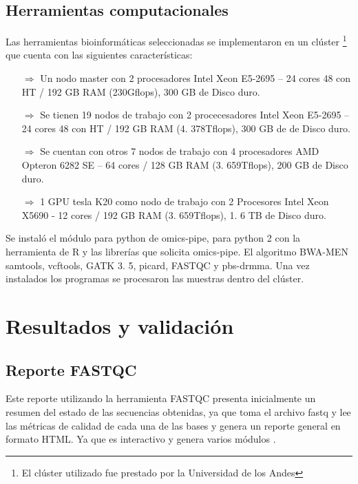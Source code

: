 {\subsection*{Herramientas computacionales}
	
	Las herramientas bioinformáticas seleccionadas se implementaron en un clúster \footnote{El clúster utilizado fue prestado por la Universidad de los Andes} que cuenta con las siguientes características:
	
	\begin{itemize}
		\item[$\Rightarrow$] Un nodo master con 2 procesadores Intel Xeon E5-2695 – 24 cores 48 con HT / 192 GB RAM (230Gflops), 300 GB de Disco duro. 
		\item[$\Rightarrow$] Se tienen 19 nodos de trabajo con 2 procecesadores  Intel Xeon E5-2695 – 24 cores 48 con HT / 192 GB RAM (4. 378Tflops), 300 GB de de Disco duro. 
		\item[$\Rightarrow$] Se cuentan con otros 7 nodos de trabajo con 4 procesadores AMD Opteron 6282 SE – 64 cores / 128 GB RAM (3. 659Tflops), 200 GB de Disco duro. 
		
		\item[$\Rightarrow$] 1 GPU tesla K20 como nodo de trabajo con 2 Procesores  Intel Xeon X5690 - 12 cores / 192 GB RAM (3. 659Tflops), 1. 6 TB de Disco duro. 
		
	\end{itemize}
	
Se instaló el módulo para python de omics-pipe, para python 2 con la herramienta de R y las librerías que solicita omics-pipe\cite{Fisch2015}. El algoritmo BWA-MEN samtools, vcftools, GATK 3. 5, picard, FASTQC y pbs-drmma. Una vez instalados los programas se procesaron las muestras dentro del clúster.  


\section{Resultados y validación}
	\subsection*{Reporte FASTQC}}

Este reporte utilizando la herramienta FASTQC presenta inicialmente un resumen del estado de las secuencias obtenidas, ya que toma el archivo fastq y lee las métricas de calidad de cada una de las bases y genera un reporte general en formato HTML. Ya que es interactivo y genera varios módulos \cite{Babraham2016}. \\

